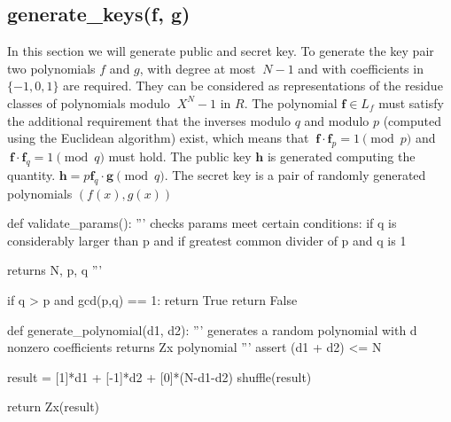 \documentclass{article}
\begin{document}
\subsection{generate\_keys(f, g)}
In this section we will generate public and secret key. To generate the key pair two polynomials $f$ and $g$, with degree at most ${\displaystyle \ N-1} $  and with coefficients in $\{-1,0,1\}$ are required. They can be considered as representations of the residue classes of polynomials modulo ${\displaystyle \ X^{N}-1} $  in $R$.
The polynomial ${\displaystyle {\textbf {f}}\in L_{f}}  $  must satisfy the additional requirement that the inverses modulo $q$ and modulo $p$ (computed using the Euclidean algorithm) exist, which means that ${\displaystyle \ {\textbf {f}}\cdot {\textbf {f}}_{p}=1{\pmod {p}}} $ and $ {\displaystyle \ {\textbf {f}}\cdot {\textbf {f}}_{q}=1{\pmod {q}}}  $ must hold.  The public key $\textbf {h}$ is generated computing the quantity. 
${\displaystyle {\textbf {h}}=p{\textbf {f}}_{q}\cdot {\textbf {g}}{\pmod {q}}.}  $
The secret key is a pair of randomly generated polynomials $(f(x), g(x))$
\begin{sagesilent}
def validate_params():
    ''' checks params meet certain conditions: if q is considerably larger than p
        and if greatest common divider of p and q is 1 
        
        returns N, p, q '''
  
    if q > p and gcd(p,q) == 1:
        return True
    return False

def generate_polynomial(d1, d2):
    ''' generates a random polynomial with d nonzero coefficients
        returns Zx polynomial '''
    assert (d1 + d2) <= N       
    
    result = [1]*d1 + [-1]*d2 + [0]*(N-d1-d2)  
    shuffle(result)
    
    return Zx(result)
\end{sagesilent}
\end{document}
